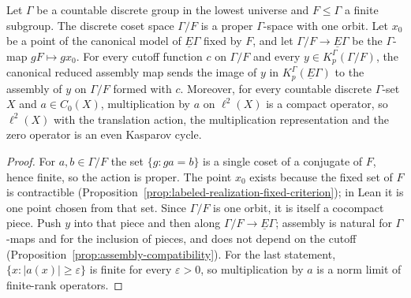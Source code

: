 \begin{proposition}\label{prop:coset-space-assembly}
\leanok
Let $\Gamma$ be a countable discrete group in the lowest universe and
$F\le\Gamma$ a finite subgroup. The discrete coset space $\Gamma/F$ is a proper
$\Gamma$-space with one orbit. Let $x_0$ be a point of the canonical model of
$\underline E\Gamma$ fixed by $F$, and let $\Gamma/F\to\underline E\Gamma$ be the
$\Gamma$-map $gF\mapsto gx_0$. For every cutoff function $c$ on $\Gamma/F$ and every
$y\in K^\Gamma_p(\Gamma/F)$, the canonical reduced assembly map sends the image of $y$
in $K^\Gamma_p(\underline E\Gamma)$ to the assembly of $y$ on $\Gamma/F$ formed with
$c$. Moreover, for every countable discrete $\Gamma$-set $X$ and $a\in C_0(X)$,
multiplication by $a$ on $\ell^2(X)$ is a compact operator, so $\ell^2(X)$ with the
translation action, the multiplication representation and the zero operator is an
even Kasparov cycle.
\end{proposition}
\begin{proof}
\leanok
For $a,b\in\Gamma/F$ the set $\{g: ga=b\}$ is a single coset of a conjugate of $F$,
hence finite, so the action is proper. The point $x_0$ exists because the fixed
set of $F$ is contractible
(Proposition~\ref{prop:labeled-realization-fixed-criterion}); in Lean it is one
point chosen from that set. Since $\Gamma/F$ is one orbit, it is itself a cocompact
piece. Push $y$ into that piece and then along $\Gamma/F\to\underline E\Gamma$;
assembly is natural for $\Gamma$-maps and for the inclusion of pieces, and does not
depend on the cutoff (Proposition~\ref{prop:assembly-compatibility}). For the last
statement, $\{x:|a(x)|\ge\varepsilon\}$ is finite for every $\varepsilon>0$, so
multiplication by $a$ is a norm limit of finite-rank operators.
\end{proof}


